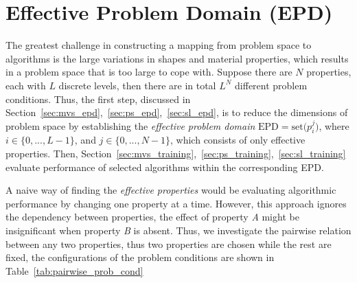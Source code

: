 
\section{Effective Problem Domain (EPD)}
The greatest challenge in constructing a mapping from problem space to algorithms is the large variations in shapes and material properties, which results in a problem space that is too large to cope with. Suppose there are $N$ properties, each with $L$ discrete levels, then there are in total $L^N$ different problem conditions. Thus, the first step, discussed in Section~\ref{sec:mvs_epd},~\ref{sec:ps_epd},~\ref{sec:sl_epd}, is to reduce the dimensions of problem space by establishing the \textit{effective problem domain} $\text{EPD}=\text{set(}p_i^j\text{)}$, where $i\in\{0, ..., L-1\}$, and $j\in \{0, ..., N-1\}$, which consists of only effective properties. Then, Section~\ref{sec:mvs_training},~\ref{sec:ps_training},~\ref{sec:sl_training} evaluate performance of selected algorithms within the corresponding EPD.

A naive way of finding the \textit{effective properties} would be evaluating algorithmic performance by changing one property at a time. However, this approach ignores the dependency between properties, \ie the effect of property \textit{A} might be insignificant when property \textit{B} is absent. Thus, we investigate the pairwise relation between any two properties, thus two properties are chosen while the rest are fixed, the configurations of the problem conditions are shown in Table~\ref{tab:pairwise_prob_cond}

